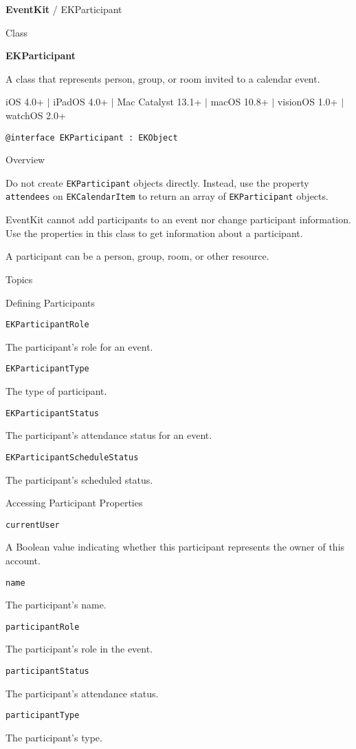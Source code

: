 \documentclass{article}
\title{}
\author{}
\date{}
\begin{document}
\textbf{EventKit} / EKParticipant

Class

\textbf{EKParticipant}

A class that represents person, group, or room invited to a calendar event.

iOS 4.0+ $|$ iPadOS 4.0+ $|$ Mac Catalyst 13.1+ $|$ macOS 10.8+ $|$ visionOS 1.0+ $|$ watchOS 2.0+

\texttt{@interface EKParticipant : EKObject}

Overview

Do not create \texttt{EKParticipant} objects directly. Instead, use the property \texttt{attendees} on \texttt{EKCalendarItem} to return an array of \texttt{EKParticipant} objects.

EventKit cannot add participants to an event nor change participant information. Use the properties in this class to get information about a participant.

A participant can be a person, group, room, or other resource.

Topics

Defining Participants

\texttt{EKParticipantRole}

The participant's role for an event.

\texttt{EKParticipantType}

The type of participant.

\texttt{EKParticipantStatus}

The participant's attendance status for an event.

\texttt{EKParticipantScheduleStatus}

The participant's scheduled status.

Accessing Participant Properties

\texttt{currentUser}

A Boolean value indicating whether this participant represents the owner of this account.

\texttt{name}

The participant's name.

\texttt{participantRole}

The participant's role in the event.

\texttt{participantStatus}

The participant's attendance status.

\texttt{participantType}

The participant's type.
\end{document}
